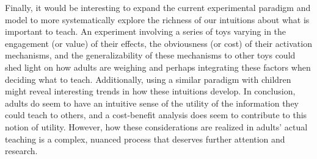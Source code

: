 \documentclass[10pt,letterpaper]{article}
\begin{document}
Finally, it would be interesting to expand the current experimental paradigm and model to more systematically explore the richness of our intuitions about what is important to teach. An experiment involving a series of toys varying in the engagement (or value) of their effects, the obviousness (or cost) of their activation mechanisms, and the generalizability of these mechanisms to other toys could shed light on how adults are weighing and perhaps integrating these factors when deciding what to teach. Additionally, using a similar paradigm with children might reveal interesting trends in how these intuitions develop. In conclusion, adults do seem to have an intuitive sense of the utility of the information they could teach to others, and a cost-benefit analysis does seem to contribute to this notion of utility. However, how these considerations are realized in adults' actual teaching is a complex, nuanced process that deserves further attention and research. 


\setlength{\bibleftmargin}{.125in}
\setlength{\bibindent}{-\bibleftmargin}


\end{document}
